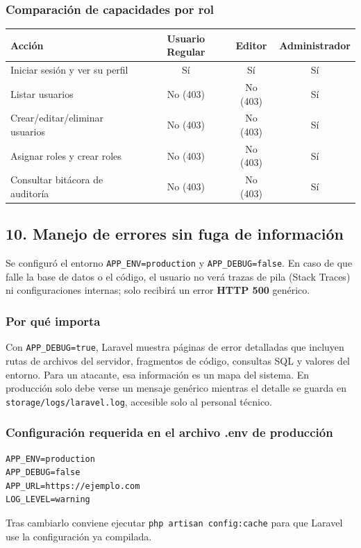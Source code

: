 \subsubsection{Comparación de capacidades por rol}
\begin{center}
\begin{tabular}{lccc}
\toprule
\textbf{Acción} & \textbf{Usuario Regular} & \textbf{Editor} & \textbf{Administrador} \\
\midrule
Iniciar sesión y ver su perfil & Sí & Sí & Sí \\
Listar usuarios & No (403) & No (403) & Sí \\
Crear/editar/eliminar usuarios & No (403) & No (403) & Sí \\
Asignar roles y crear roles & No (403) & No (403) & Sí \\
Consultar bitácora de auditoría & No (403) & No (403) & Sí \\
\bottomrule
\end{tabular}
\end{center}

\subsection{10. Manejo de errores sin fuga de información}
Se configuró el entorno \texttt{APP\_ENV=production} y \texttt{APP\_DEBUG=false}. En caso de que falle la base de datos o el código, el usuario no verá trazas de pila (Stack Traces) ni configuraciones internas; solo recibirá un error \textbf{HTTP 500} genérico.

\subsubsection{Por qué importa}
Con \texttt{APP\_DEBUG=true}, Laravel muestra páginas de error detalladas que incluyen rutas de archivos del servidor, fragmentos de código, consultas SQL y valores del entorno. Para un atacante, esa información es un mapa del sistema. En producción solo debe verse un mensaje genérico mientras el detalle se guarda en \texttt{storage/logs/laravel.log}, accesible solo al personal técnico.

\subsubsection{Configuración requerida en el archivo .env de producción}
\begin{lstlisting}[language={}, caption={.env de producción (no versionado)}]
APP_ENV=production
APP_DEBUG=false
APP_URL=https://ejemplo.com
LOG_LEVEL=warning
\end{lstlisting}
Tras cambiarlo conviene ejecutar \texttt{php artisan config:cache} para que Laravel use la configuración ya compilada.

